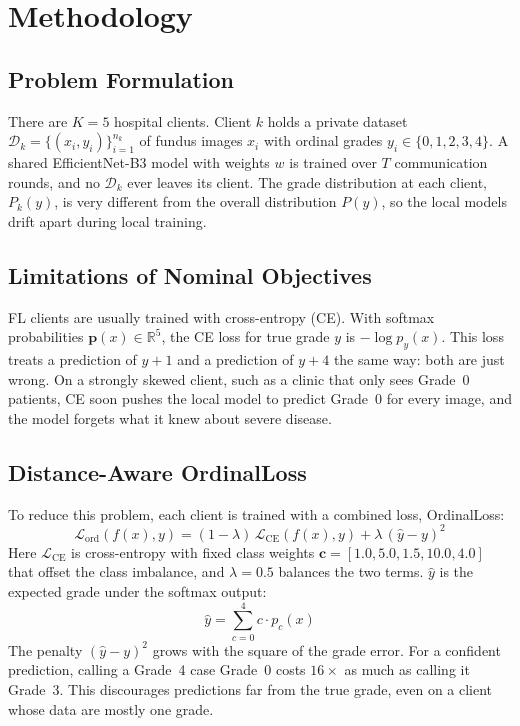 \section{Methodology}
\label{sec:method}

\subsection{Problem Formulation}

There are $K = 5$ hospital clients. Client $k$ holds a private dataset
$\mathcal{D}_k = \{(x_i, y_i)\}_{i=1}^{n_k}$ of fundus images $x_i$ with ordinal
grades $y_i \in \{0, 1, 2, 3, 4\}$. A shared EfficientNet-B3 model with weights $w$
is trained over $T$ communication rounds, and no $\mathcal{D}_k$ ever leaves its
client. The grade distribution at each client, $P_k(y)$, is very different from the
overall distribution $P(y)$, so the local models drift apart during local training.

\subsection{Limitations of Nominal Objectives}

FL clients are usually trained with cross-entropy (CE). With softmax probabilities
$\mathbf{p}(x) \in \mathbb{R}^5$, the CE loss for true grade $y$ is $-\log p_y(x)$.
This loss treats a prediction of $y+1$ and a prediction of $y+4$ the same way: both
are just wrong. On a strongly skewed client, such as a clinic that only sees
Grade~0 patients, CE soon pushes the local model to predict Grade~0 for every
image, and the model forgets what it knew about severe disease.

\subsection{Distance-Aware OrdinalLoss}

To reduce this problem, each client is trained with a combined loss, OrdinalLoss:
\begin{equation}
\mathcal{L}_{\text{ord}}(f(x), y) =
  (1 - \lambda)\,\mathcal{L}_{\text{CE}}(f(x), y)
  + \lambda\,(\hat{y} - y)^2
\label{eq:ordloss}
\end{equation}
Here $\mathcal{L}_{\text{CE}}$ is cross-entropy with fixed class weights
$\mathbf{c} = [1.0, 5.0, 1.5, 10.0, 4.0]$ that offset the class imbalance, and
$\lambda = 0.5$ balances the two terms. $\hat{y}$ is the expected grade under the
softmax output:
\begin{equation}
\hat{y} = \sum_{c=0}^{4} c \cdot p_c(x)
\label{eq:expgrade}
\end{equation}
The penalty $(\hat{y} - y)^2$ grows with the square of the grade error. For a
confident prediction, calling a Grade~4 case Grade~0 costs $16\times$ as much as
calling it Grade~3. This discourages predictions far from the true grade, even on a
client whose data are mostly one grade.

